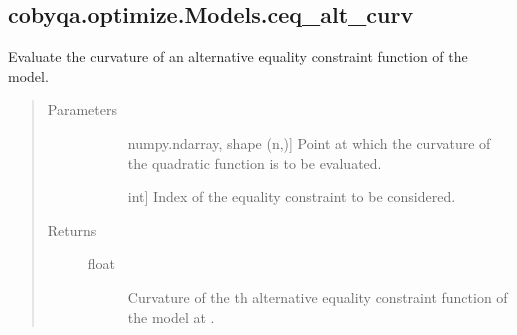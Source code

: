 \documentclass[letterpaper,10pt,english]{sphinxmanual}
\begin{document}
\begin{fulllineitems}
\begin{fulllineitems}
\end{fulllineitems}



\subsection{cobyqa.optimize.Models.ceq\_alt\_curv}
\label{\detokenize{refs/generated/cobyqa.optimize.Models.ceq_alt_curv:cobyqa-optimize-models-ceq-alt-curv}}\label{\detokenize{refs/generated/cobyqa.optimize.Models.ceq_alt_curv::doc}}

\begin{fulllineitems}
\label{\detokenize{refs/generated/cobyqa.optimize.Models.ceq_alt_curv:cobyqa.optimize.Models.ceq_alt_curv}}
\sphinxAtStartPar
Evaluate the curvature of an alternative equality constraint function of
the model.
\begin{quote}\begin{description}
\item[{Parameters}] \leavevmode\begin{description}
\item[{}] \leavevmode{[}numpy.ndarray, shape (n,){]}
\sphinxAtStartPar
Point at which the curvature of the quadratic function is to be
evaluated.

\item[{}] \leavevmode{[}int{]}
\sphinxAtStartPar
Index of the equality constraint to be considered.

\end{description}

\item[{Returns}] \leavevmode\begin{description}
\item[{float}] \leavevmode
\sphinxAtStartPar
Curvature of the \sphinxhyphen{}th alternative equality constraint function of
the model at .

\end{description}

\end{description}\end{quote}

\end{fulllineitems}




\end{fulllineitems}
\end{document}

